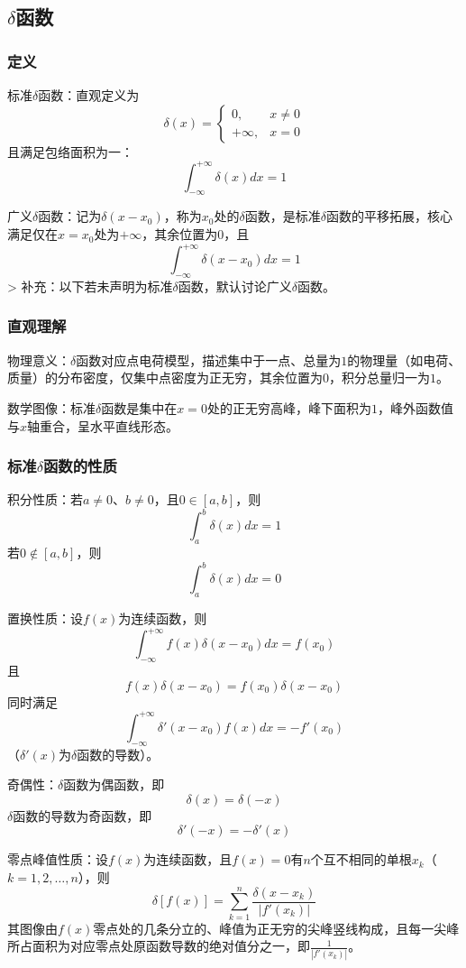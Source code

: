 \documentclass{article}
\begin{document}
	
	
	\subsection{$\delta$函数}
	
	\subsubsection{定义}
	标准$\delta$函数：直观定义为
	\[
	\delta(x)=
	\begin{cases}
		0, & x\neq0 \\
		+\infty, & x = 0
	\end{cases}
	\]
	且满足包络面积为一：
	\[
	\int_{-\infty}^{+\infty}\delta(x)dx = 1
	\]
	
	广义$\delta$函数：记为$\delta(x - x_0)$，称为$x_0$处的$\delta$函数，是标准$\delta$函数的平移拓展，核心满足仅在$x = x_0$处为$+\infty$，其余位置为$0$，且
	\[
	\int_{-\infty}^{+\infty}\delta(x - x_0)dx = 1
	\]
	> 补充：以下若未声明为标准$\delta$函数，默认讨论广义$\delta$函数。
	
	\subsubsection{直观理解}
	物理意义：$\delta$函数对应点电荷模型，描述集中于一点、总量为$1$的物理量（如电荷、质量）的分布密度，仅集中点密度为正无穷，其余位置为$0$，积分总量归一为$1$。
	
	数学图像：标准$\delta$函数是集中在$x = 0$处的正无穷高峰，峰下面积为$1$，峰外函数值与$x$轴重合，呈水平直线形态。
	
	\subsubsection{标准$\delta$函数的性质}
	积分性质：若$a\neq0$、$b\neq0$，且$0\in[a,b]$，则
	\[
	\int_{a}^{b}\delta(x)dx = 1
	\]
	若$0\notin[a,b]$，则
	\[
	\int_{a}^{b}\delta(x)dx = 0
	\]
	
	置换性质：设$f(x)$为连续函数，则
	\[
	\int_{-\infty}^{+\infty}f(x)\delta(x - x_0)dx = f(x_0)
	\]
	且
	\[
	f(x)\delta(x - x_0) = f(x_0)\delta(x - x_0)
	\]
	同时满足
	\[
	\int_{-\infty}^{+\infty}\delta'(x - x_0)f(x)dx = -f'(x_0)
	\]
	（$\delta'(x)$为$\delta$函数的导数）。
	
	奇偶性：$\delta$函数为偶函数，即
	\[
	\delta(x) = \delta(-x)
	\]
	$\delta$函数的导数为奇函数，即
	\[
	\delta'(-x) = -\delta'(x)
	\]
	
	零点峰值性质：设$f(x)$为连续函数，且$f(x)=0$有$n$个互不相同的单根$x_k$（$k = 1,2,\dots,n$），则
	\[
	\delta[f(x)] = \sum_{k = 1}^{n}\frac{\delta(x - x_k)}{|f'(x_k)|}
	\]
	其图像由$f(x)$零点处的几条分立的、峰值为正无穷的尖峰竖线构成，且每一尖峰所占面积为对应零点处原函数导数的绝对值分之一，即$\frac{1}{|f'(x_k)|}$。
	
\end{document}
